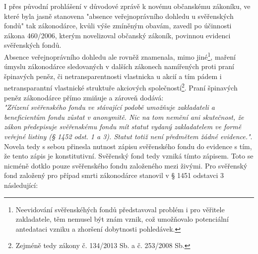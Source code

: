 \documentclass{article}
\begin{document}


I přes původní prohlášení v důvodové zprávě k novému občanskému zákoníku, ve které byla jasně stanovena "absence veřejnoprávního dohledu u svěřenských fondů" tak zákonodárce, kvůli výše zmíněným obavám, zavedl po účinnosti zákona 460/2006, kterým novelizoval občanský zákoník, povinnou evidenci svěřenských fondů.\\

Absence veřejnoprávního dohledu ale rovněž znamenala, mimo jiné\footnote{Neevidování svěřenskéhých fondů představoval problém i pro věřitele zakladatele, těm nemusel být znám vznik, což umožňovalo potenciální antedataci vzniku a zhoršení dobytnosti pohledávek.}, maření úmyslu zákonodárce sledovaných v dalších zákonech namířených proti praní špinavých peněz, či netransparentnosti vlastnicka u akcií a tím pádem i netransparantní vlastnické struktuře akciových společností\footnote{Zejméně tedy zákony č. 134/2013 Sb. a č. 253/2008 Sb.}. Praní špinavých peněz zákonodárce přímo zmiňuje a zároveň dodává:\\

\textit{"Zřízení svěřenského fondu ve stávající podobě umožňuje zakladateli a beneficientům fondu zůstat v anonymitě. Nic na tom nemění ani skutečnost, že zákon předepisuje svěřenskému fondu mít statut vydaný zakladatelem ve formě veřejné listiny (§ 1452 odst. 1 a 3). Statut totiž není předmětem žádné evidence."}. \\


Novela tedy s sebou přinesla nutnost zápisu svěřenského fondu do evidence s tím, že tento zápis je konstitutivní. Svěřenský fond tedy vzniká tímto zápisem. Toto se nicméně dotklo pouze svěřenského fondu založeného mezi živými. Pro svěřenský fond založený pro případ smrti zákonodárce stanovil v § 1451 odstavci 3 následující:\\
\end{document}
